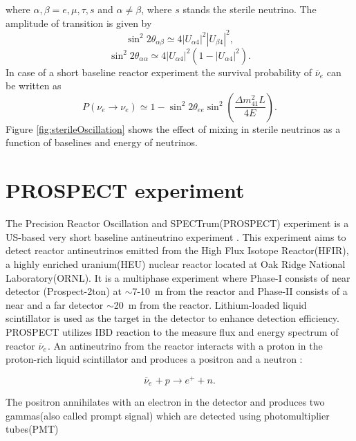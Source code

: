 \documentclass[11pt]{article}
\newcommand{\nuebar}{\ensuremath{\overline{\nu }_{e}} \hspace{1pt}}
\numberwithin{equation}{section}
\begin{document}
where $\alpha, \beta = e, \mu, \tau, s $ and $\alpha \neq \beta$, where $s$ stands the sterile neutrino. The amplitude of transition is given by 
\begin{equation}
\sin^{2} 2 \theta _{\alpha \beta} \simeq 4|U_{\alpha 4}|^{2}|U_{\beta 4}|^2,
\end{equation}
\begin{equation}
\sin^{2} 2 \theta _{\alpha \alpha} \simeq 4|U_{\alpha 4}|^{2}(1- |U_{\alpha 4}|^2).
\end{equation}
In case of a short baseline reactor experiment the survival probability of \nuebar can be written as 
\begin{equation}
\label{eq:eemixing}
P(\nu_{e} \rightarrow \nu_{e}) \simeq 1- \sin^{2} 2 \theta _{ee} \sin^{2}(\frac{\Delta m^{2}_{41} L }{4 E}).
\end{equation}	
Figure \ref{fig:sterileOscillation} shows the effect of mixing in sterile neutrinos as a function of baselines and energy of neutrinos.  

\section[PROSPECT experiment]{PROSPECT experiment}

The Precision Reactor Oscillation and SPECTrum(PROSPECT) experiment is a US-based very short baseline antineutrino experiment \cite{PROSPECT}. This experiment aims to detect reactor antineutrinos emitted from the High Flux Isotope Reactor(HFIR), a highly enriched uranium(HEU) nuclear reactor located at Oak Ridge National Laboratory(ORNL). It is a multiphase experiment where Phase-I consists of near detector (Prospect-2ton) at $\sim$7-10~m from the reactor and Phase-II consists of a near and a far detector $\sim$20~m from the reactor. Lithium-loaded liquid scintillator is used as the target in the detector to enhance detection efficiency. 
PROSPECT utilizes IBD reaction to the measure flux and energy spectrum of reactor $\nuebar$. 
An antineutrino from the reactor interacts with a proton in the proton-rich liquid scintillator and produces a positron and a neutron :

\begin{equation}
\nuebar + p \rightarrow e^{+}+n.
\end{equation}

The positron annihilates with an electron in the detector and produces two gammas(also called prompt signal) which are detected using photomultiplier tubes(PMT)
\end{document}
